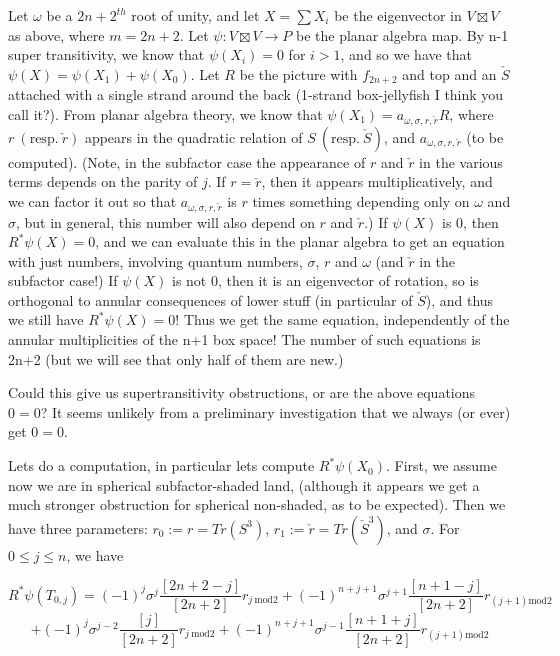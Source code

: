 \documentclass[12pt]{article}
\begin{document}
Let $\omega$ be a $2n+2^{th}$ root of unity, and let $X=\sum X_{i}$ be the eigenvector in $V\boxtimes V$ as above, where $m=2n+2$. Let $\psi: V\boxtimes V\rightarrow P$ be the planar algebra map.  By n-1 super transitivity, we know that $\psi(X_i)=0$ for $i>1$, and so we have that $\psi(X)=\psi(X_1)+\psi(X_0)$.  Let $R$ be the picture with $f_{2n+2}$ and top and an $\check{S}$ attached with a single strand around the back (1-strand box-jellyfish I think you call it?).  From planar algebra theory, we know that $\psi(X_1)=a_{\omega, \sigma, r, \check{r}} R$, where $r\ (\text{resp.}\ \check{r})$ appears in the quadratic relation of $S\ (\text{resp.}\ \check{S})$, and $a_{\omega, \sigma, r, \check{r}}$ (to be computed). (Note, in the subfactor case the appearance of $r$ and $\check{r}$ in the various terms depends on the parity of $j$.  If $r=\check{r}$, then it appears multiplicatively, and we can factor it out so that $a_{\omega, \sigma, r, \check{r}}$ is $r$ times something depending only on $\omega$ and $\sigma$, but in general, this number will also depend on $r$ and $\check{r}$.) If $\psi(X)$ is $0$, then $R^{*}\psi(X)=0$, and we can evaluate this in the planar algebra to get an equation with just numbers, involving quantum numbers, $\sigma$, $r$ and $\omega$ (and $\check{r}$ in the subfactor case!)  If $\psi(X)$ is not $0$, then it is an eigenvector of rotation, so is orthogonal to annular consequences of lower stuff (in particular of $\check{S}$), and thus we still have $R^{*}\psi(X)=0$!  Thus we get the same equation, independently of the annular multiplicities of the n+1 box space!  The number of such equations is 2n+2 (but we will see that only half of them are new.)


Could this give us supertransitivity obstructions, or are the above equations  $0=0$?  It seems unlikely from a preliminary investigation that we always (or ever) get $0=0$.

\bigskip

Lets do a computation,  in particular lets compute $R^{*}\psi(X_0)$.  First, we assume now we are in spherical subfactor-shaded land, (although it appears we get a much stronger obstruction for spherical non-shaded, as to be expected).  Then we have three parameters: $r_{0}:=r=Tr(S^{3})$,  $r_{1}:=\check{r}=Tr(\check{S}^{3})$, and $\sigma$. For $0\le j\le n$, we have

$$R^{*}\psi(T_{0,j})=(-1)^{j}\sigma^{j}\frac{[2n+2-j]}{[2n+2]} r_{j\ \text{mod}2}+(-1)^{n+j+1}\sigma^{j+1}\frac{[n+1-j]}{[2n+2]} r_{(j+1)\text{mod}2}$$
$$+(-1)^{j}\sigma^{j-2}\frac{[j]}{[2n+2]} r_{j\ \text{mod}2}+(-1)^{n+j+1}\sigma^{j-1}\frac{[n+1+j]}{[2n+2]} r_{(j+1)\text{mod}2}$$
\end{document}
